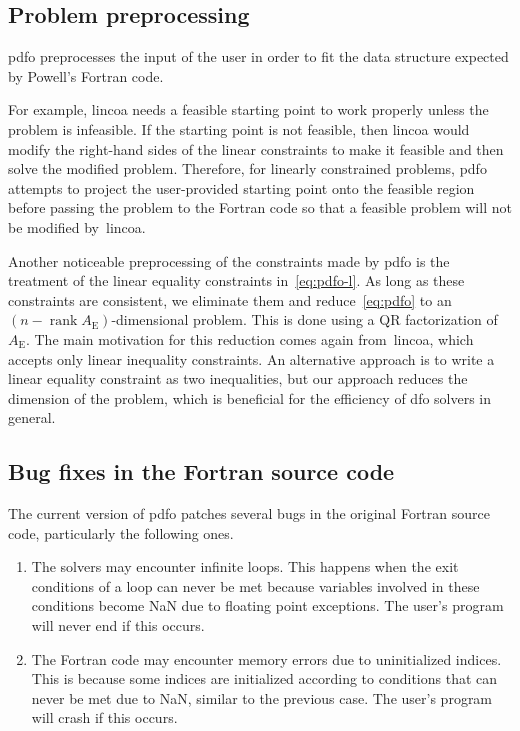 \documentclass{article}
\numberwithin{equation}{section}
\theoremstyle{definition}
\theoremstyle{plain}
\theoremstyle{remark}
\DeclareMathOperator{\rank}{rank}
\newcommand{\aeq}{A_{\scriptscriptstyle\text{E}}}
\begin{document}
\subsection{Problem preprocessing}
\label{subsec:pdfo-preprocessing}

\Gls{pdfo} preprocesses the input of the user in order to fit the data structure expected by Powell's Fortran code.

For example, \gls{lincoa} needs a feasible starting point to work properly unless the problem is infeasible.
If the starting point is not feasible, then \gls{lincoa} would modify the right-hand sides of the linear constraints to make it feasible and then solve the modified problem.
Therefore, for linearly constrained problems, \gls{pdfo} attempts to project the user-provided starting point onto the feasible region before passing the problem to the Fortran code so that a feasible problem will not be modified by~\gls{lincoa}.

Another noticeable preprocessing of the constraints made by \gls{pdfo} is the treatment of the linear equality constraints in~\eqref{eq:pdfo-l}.
As long as these constraints are consistent, we eliminate them and reduce~\eqref{eq:pdfo} to an~$(n - \rank \aeq)$-dimensional problem.
This is done using a QR factorization of~$\aeq$.
The main motivation for this reduction comes again from~\gls{lincoa}, which accepts only linear inequality constraints.
An alternative approach is to write a linear equality constraint as two inequalities, but our approach reduces the dimension of the problem, which is beneficial for the efficiency of \gls{dfo} solvers in general.

\subsection{Bug fixes in the Fortran source code}
\label{subsec:bug-corrections}

The current version of \gls{pdfo} patches several bugs in the original Fortran source code, particularly the following ones.
\begin{enumerate}
    \item The solvers may encounter infinite loops.
        This happens when the exit conditions of a loop can never be met because variables involved in these conditions become NaN due to floating point exceptions.
        The user's program will never end if this occurs.
    \item The Fortran code may encounter memory errors due to uninitialized indices.
        This is because some indices are initialized according to conditions that can never be met due to NaN, similar to the previous case.
        The user's program will crash if this occurs.
\end{enumerate}
\end{document}
